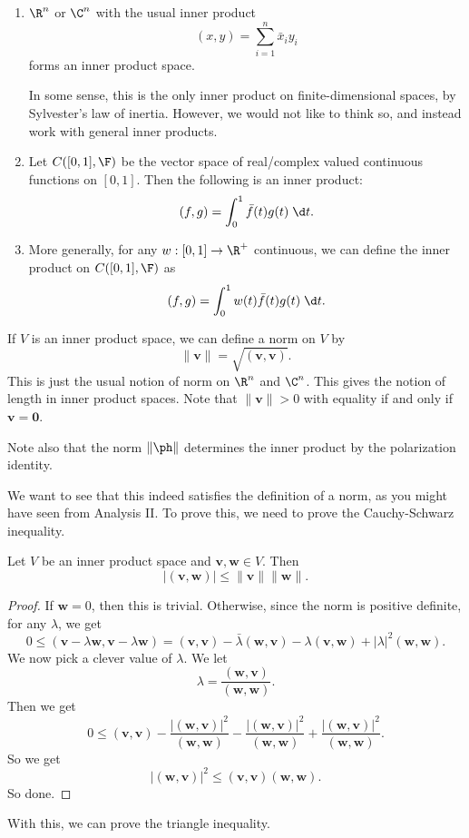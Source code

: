 \documentclass[a4paper]{article}
\begin{document}
\begin{eg}\leavevmode
  \begin{enumerate}
    \item $\R^n$ or $\C^n$ with the usual inner product
      \[
        (x, y) = \sum_{i = 1}^n \bar{x}_i y_i
      \]
      forms an inner product space.

      In some sense, this is the only inner product on finite-dimensional spaces, by Sylvester's law of inertia. However, we would not like to think so, and instead work with general inner products.
    \item Let $C([0, 1], \F)$ be the vector space of real/complex valued continuous functions on $[0, 1]$. Then the following is an inner product:
      \[
        (f, g) = \int_0^1 \bar{f}(t) g(t)\;\d t.
      \]
    \item More generally, for any $w: [0, 1] \to \R^+$ continuous, we can define the inner product on $C([0, 1], \F)$ as
      \[
        (f, g) = \int_0^1 w(t) \bar{f}(t) g(t) \;\d t.
      \]
  \end{enumerate}
\end{eg}
If $V$ is an inner product space, we can define a norm on $V$ by
\[
  \|\mathbf{v}\| = \sqrt{(\mathbf{v}, \mathbf{v})}.
\]
This is just the usual notion of norm on $\R^n$ and $\C^n$. This gives the notion of length in inner product spaces. Note that $\|\mathbf{v}\| > 0$ with equality if and only if $\mathbf{v} = \mathbf{0}$.

Note also that the norm $\|\ph\|$ determines the inner product by the polarization identity.

We want to see that this indeed satisfies the definition of a norm, as you might have seen from Analysis II. To prove this, we need to prove the Cauchy-Schwarz inequality.

\begin{thm}
  Let $V$ be an inner product space and $\mathbf{v}, \mathbf{w} \in V$. Then
  \[
    |(\mathbf{v}, \mathbf{w})| \leq \|\mathbf{v}\| \|\mathbf{w}\|.
  \]
\end{thm}

\begin{proof}
  If $\mathbf{w} = 0$, then this is trivial. Otherwise, since the norm is positive definite, for any $\lambda$, we get
  \[
    0 \leq (\mathbf{v} - \lambda \mathbf{w}, \mathbf{v} - \lambda \mathbf{w}) = (\mathbf{v}, \mathbf{v}) - \bar{\lambda} (\mathbf{w}, \mathbf{v}) - \lambda (\mathbf{v}, \mathbf{w}) + |\lambda|^2 (\mathbf{w}, \mathbf{w}).
  \]
  We now pick a clever value of $\lambda$. We let
  \[
    \lambda = \frac{(\mathbf{w}, \mathbf{v})}{(\mathbf{w}, \mathbf{w})}.
  \]
  Then we get
  \[
    0 \leq (\mathbf{v}, \mathbf{v}) - \frac{|(\mathbf{w}, \mathbf{v})|^2}{(\mathbf{w}, \mathbf{w})} - \frac{|(\mathbf{w}, \mathbf{v})|^2}{(\mathbf{w}, \mathbf{w})} + \frac{|(\mathbf{w}, \mathbf{v})|^2}{(\mathbf{w}, \mathbf{w})}.
  \]
  So we get
  \[
    |(\mathbf{w}, \mathbf{v})|^2 \leq (\mathbf{v}, \mathbf{v}) (\mathbf{w}, \mathbf{w}).
  \]
  So done.
\end{proof}
With this, we can prove the triangle inequality.
\end{document}
